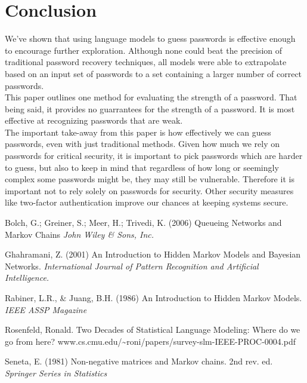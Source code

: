 \documentclass{amsart}
\theoremstyle{definition}
\theoremstyle{remark}
\numberwithin{equation}{section}
\begin{document}
\section{Conclusion}
We've shown that using language models to guess passwords is effective enough to encourage further exploration. Although none could beat the precision of traditional password recovery techniques, all models were able to extrapolate based on an input set of passwords to a set containing a larger number of correct passwords.\\
This paper outlines one method for evaluating the strength of a password. That being said, it provides no guarrantees for the strength of a password. It is most effective at recognizing passwords that are weak.\\
The important take-away from this paper is how effectively we can guess passwords, even with just traditional methods. Given how much we rely on passwords for critical security, it is important to pick passwords which are harder to guess, but also to keep in mind that regardless of how long or seemingly complex some passwords might be, they may still be vulnerable. Therefore it is important not to rely solely on passwords for security. Other security measures like two-factor authentication improve our chances at keeping systems secure.\\

\newpage

\begin{thebibliography}{9}
Bolch, G.; Greiner, S.; Meer, H.; Trivedi, K. (2006) Queueing Networks and Markov Chains
\textit{John Wiley \& Sons, Inc.}

Ghahramani, Z. (2001) An Introduction to Hidden Markov Models and Bayesian Networks.
\textit{International Journal of Pattern Recognition and Artificial Intelligence.}

Rabiner, L.R., \& Juang, B.H. (1986) An Introduction to Hidden Markov Models.
\textit{IEEE ASSP Magazine}

Rosenfeld, Ronald. Two Decades of Statistical Language Modeling: Where do we go from here?
www.cs.cmu.edu/\textasciitilde{}roni/papers/survey-slm-IEEE-PROC-0004.pdf

Seneta, E. (1981) Non-negative matrices and Markov chains. 2nd rev. ed.
\textit{Springer Series in Statistics}

\end{thebibliography}
\end{document}
